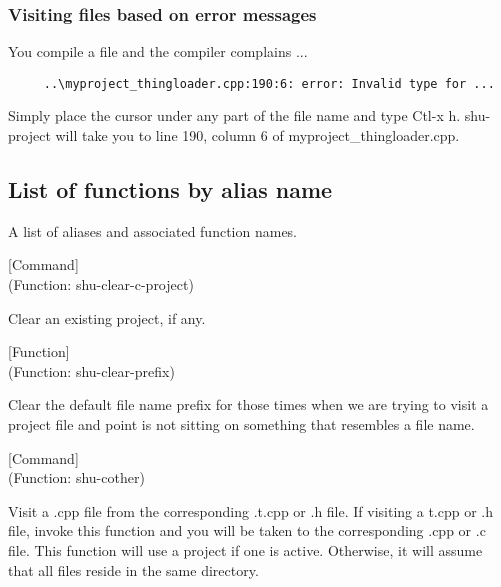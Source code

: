 \subsubsection{Visiting files based on error messages}

You compile a file and the compiler complains ...

\small{\begin{verbatim}
     ..\myproject_thingloader.cpp:190:6: error: Invalid type for ...
\end{verbatim}}

Simply place the cursor under any part of the file name and type Ctl-x h.
shu-project will take you to line 190, column 6 of myproject\_thingloader.cpp.



\subsection{List of functions by alias name}

A list of aliases and associated function names.



\vspace{1em}
\noindent
{}
\usebox{\funcname}
 \hfill [Command]\\%
 (Function: shu-clear-c-project)

\begin{doc-string}
Clear an existing project, if any.
\end{doc-string}

\vspace{1em}
\noindent
{}
\usebox{\funcname}
 \hfill [Function]\\%
 (Function: shu-clear-prefix)

\begin{doc-string}
Clear the default file name prefix for those times when we are trying to visit
a project file and point is not sitting on something that resembles a file name.
\end{doc-string}

\vspace{1em}
\noindent
{}
\usebox{\funcname}
 \hfill [Command]\\%
 (Function: shu-cother)

\begin{doc-string}
Visit a .cpp file from the corresponding .t.cpp or .h file.  If visiting a
t.cpp or .h file, invoke this function and you will be taken to the
corresponding .cpp or .c file.  This function will use a project if one is
active.  Otherwise, it will assume that all files reside in the same directory.
\end{doc-string}

